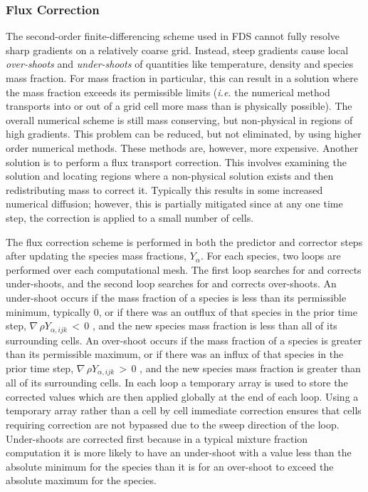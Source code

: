 \documentclass[11pt]{book}
\begin{document}
\subsubsection{Flux Correction}

The second-order finite-differencing scheme used in FDS cannot fully resolve sharp gradients on a relatively coarse grid.
Instead, steep gradients cause local {\em over-shoots} and {\em under-shoots} of quantities like temperature, density and species mass fraction.
For mass fraction in particular, this can result in a solution where the mass
fraction exceeds its permissible limits ({\em i.e.} the numerical method transports into or out of a grid
cell more mass than is physically possible).  The overall numerical scheme is still mass conserving,
but non-physical in regions of high gradients.  This problem can be reduced, but not eliminated,
by using higher order numerical methods.  These methods are, however, more expensive.  Another
solution is to perform a flux transport correction.  This involves examining the solution and
locating regions where a non-physical solution exists and then redistributing mass to correct it.
Typically this results in some increased numerical diffusion; however, this is partially mitigated
since at any one time step, the correction is applied to a small number of cells.

The flux correction scheme is performed in both the predictor and corrector steps after updating the species mass
fractions, $Y_\alpha$.  For each species, two loops are performed over each computational mesh.  The first loop searches for
and corrects under-shoots, and the second loop searches for and corrects over-shoots.  An under-shoot occurs if the
mass fraction of a species is less than its permissible minimum, typically 0,  or if there was an outflux of that
species in the prior time step, $\nabla \, \rho Y_{\alpha,ijk} \, < \, 0$ , and the new species mass fraction
is less than all of its surrounding cells.  An over-shoot occurs if the
mass fraction of a species is greater than its permissible maximum,  or if there was an influx of that
species in the prior time step, $\nabla \, \rho Y_{\alpha,ijk} \, > \, 0$ , and the new species mass fraction
is greater than all of its surrounding cells.  In each loop a temporary array is used to store the corrected values
which are then applied globally at the end of each loop.  Using a temporary array rather than a cell by cell
immediate correction ensures that cells requiring correction are not bypassed due to the sweep direction of the loop.
Under-shoots are corrected first because in a typical mixture fraction computation it is more likely to have an under-shoot
with a value less than the absolute minimum for the species than it is for an over-shoot to exceed the absolute maximum
for the species.
\end{document}

